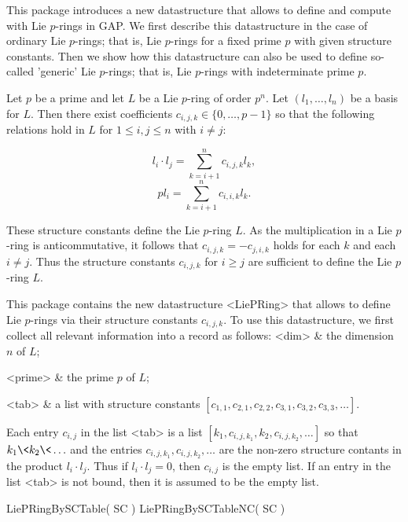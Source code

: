 

This package introduces a new datastructure that allows to define and
compute with Lie $p$-rings in GAP. We first describe this datastructure
in the case of ordinary Lie $p$-rings; that is, Lie $p$-rings for a fixed
prime $p$ with given structure constants. Then we show how this datastructure
can also be used to define so-called 'generic' Lie $p$-rings; that is, 
Lie $p$-rings with indeterminate prime $p$.


Let $p$ be a prime and let $L$ be a Lie $p$-ring of order $p^n$. Let 
$(l_1, \ldots, l_n)$ be a basis for $L$. Then there exist coefficients 
$c_{i,j,k} \in \{0, \ldots, p-1\}$ so that the following relations hold 
in $L$ for $1 \leq i,j \leq n$ with $i \neq j$:

$$ l_i \cdot l_j = \sum_{k=i+1}^n c_{i,j,k} l_k, $$
$$ p l_i = \sum_{k=i+1}^n c_{i,i,k} l_k. $$

These structure constants define the Lie $p$-ring $L$. As the multiplication 
in a Lie $p$-ring is anticommutative, it follows that $c_{i,j,k} = -c_{j,i,k}$ 
holds for each $k$ and each $i \neq j$. Thus the structure constants 
$c_{i,j,k}$ for $i \geq j$ are sufficient to define the Lie $p$-ring $L$.

This package contains the new datastructure <LiePRing> that allows to 
define Lie $p$-rings via their structure constants $c_{i,j,k}$. To use
this datastructure, we first collect all relevant information into a 
record as follows:
\beginitems
<dim> &
   the dimension $n$ of $L$;

<prime> &
   the prime $p$ of $L$;

<tab> &
   a list with structure constants 
   $[c_{1,1}, c_{2,1}, c_{2,2}, c_{3,1}, c_{3,2}, c_{3,3}, \ldots]$.
\enditems

Each entry $c_{i,j}$ in the list <tab> is a list $[k_1, c_{i,j,k_1}, k_2, 
c_{i,j,k_2}, \ldots]$ so that $k_1 \< k_2 \< \ldots$ and the entries 
$c_{i,j,k_1}, c_{i,j,k_2}, \ldots$ are the non-zero structure contants 
in the product $l_i \cdot l_j$. Thus if $l_i \cdot l_j = 0$, then $c_{i,j}$
is the empty list. If an entry in the list <tab> is not bound, then it is
assumed to be the empty list.

\> LiePRingBySCTable( SC )
\> LiePRingBySCTableNC( SC )

